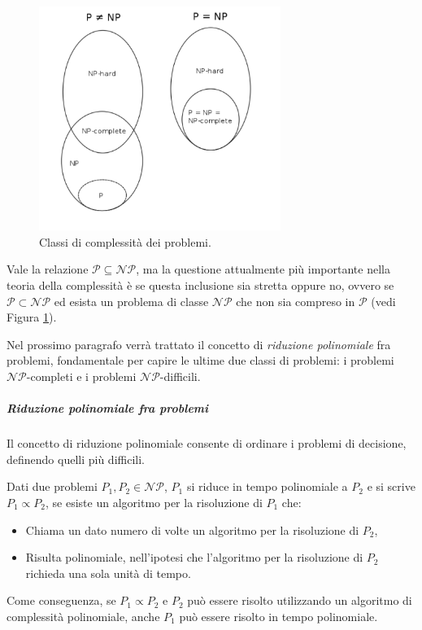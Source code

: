 \begin{figure}[ht]
 \begin{center}
  \includegraphics[width=0.7\textwidth]{appendici/figure/ClassiComplessita.pdf}
  \caption{Classi di complessità dei problemi.}
  \label{fig:ClassiComplessita}
 \end{center}
\end{figure}


Vale la relazione $\mathcal{P} \subseteq \mathcal{NP}$, ma la questione attualmente più 
importante nella teoria della complessità è se questa inclusione sia stretta oppure 
no, ovvero se $\mathcal{P} \subset \mathcal{NP}$ ed esista un problema di classe 
$\mathcal{NP}$ che non sia compreso in $\mathcal{P}$ \cite{GasarchPoll} (vedi Figura 
\ref{fig:ClassiComplessita}).

Nel prossimo paragrafo verrà trattato il concetto di \emph{riduzione polinomiale} fra 
problemi, fondamentale per capire le ultime due classi di problemi: i problemi 
$\mathcal{NP}$-completi e i problemi $\mathcal{NP}$-difficili.

\subparagraph{Riduzione polinomiale fra problemi}
Il concetto di riduzione polinomiale consente di ordinare i problemi di decisione, 
definendo quelli più difficili.

\begin{mydef}
 Dati due problemi $P_1, P_2 \in \mathcal{NP}$, $P_1$ si riduce in tempo polinomiale a 
$P_2$ e si scrive $P_1 \propto P_2$, se esiste un algoritmo per la risoluzione di $P_1$ 
che:
\begin{itemize}
 \item Chiama un dato numero di volte un algoritmo per la risoluzione di $P_2$,
 \item Risulta polinomiale, nell'ipotesi che l'algoritmo per la risoluzione di $P_2$ 
richieda una sola unità di tempo.
\end{itemize}
\end{mydef}
Come conseguenza, se $P_1 \propto P_2$ e $P_2$ può essere risolto utilizzando un 
algoritmo di complessità polinomiale, anche $P_1$ può essere risolto in tempo polinomiale.

